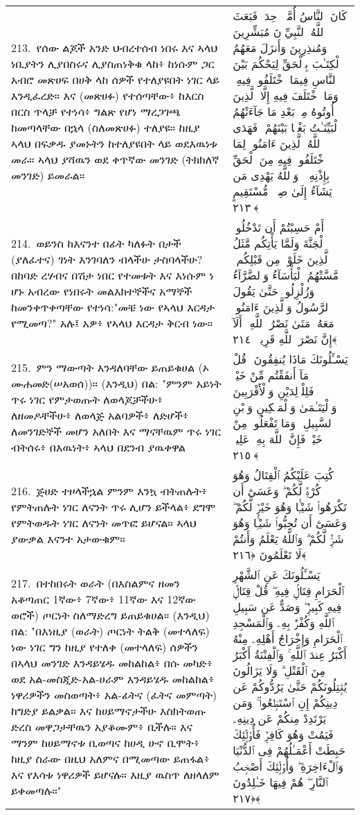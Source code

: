 \documentclass[11pt,a4paper,oneside]{article}%
\newcommand{\mytextarabic}[1]{\textarabic{ #1 \flushright}}
\begin{document}
\begin{longtable}{%
  @{}
    p{}
  @{~~~}
    p{}
    @{}
}
213.\ የሰው ልጆች አንድ ህብረተሰብ ነበሩ እና ኣላህ ነቢያትን ሊያበስሩና ሊያስጠነቅቁ ላከ፥ ከነሱም ጋር አብሮ መጽሀፍ በሀቅ ላከ ሰዎች የተለያዩበት ነገር ላይ እንዲፈረድ። እና (መጽሀፉ) የተሰጣቸው፥ ከእርስ በርስ ጥላቻ የተነሳ፥ ግልጽ የሆነ ማረጋገጫ ከመጣላቸው በኋላ (ስለመጽሀፉ) ተለያዩ። ከዚያ ኣላህ በፍቃዱ ያመኑትን ከተለያዩበት ላይ ወደእዉነቱ መራ። ኣላህ ያሻዉን ወደ ቀጥኛው መንገድ (ትክክለኛ መንገድ) ይመራል። &  \mytextarabic{ كَانَ ٱلنَّاسُ أُمَّةًۭ وَٟحِدَةًۭ فَبَعَثَ ٱللَّهُ ٱلنَّبِيِّۦنَ مُبَشِّرِينَ وَمُنذِرِينَ وَأَنزَلَ مَعَهُمُ ٱلْكِتَـٰبَ بِٱلْحَقِّ لِيَحْكُمَ بَيْنَ ٱلنَّاسِ فِيمَا ٱخْتَلَفُوا۟ فِيهِ ۚ وَمَا ٱخْتَلَفَ فِيهِ إِلَّا ٱلَّذِينَ أُوتُوهُ مِنۢ بَعْدِ مَا جَآءَتْهُمُ ٱلْبَيِّنَـٰتُ بَغْيًۢا بَيْنَهُمْ ۖ فَهَدَى ٱللَّهُ ٱلَّذِينَ ءَامَنُوا۟ لِمَا ٱخْتَلَفُوا۟ فِيهِ مِنَ ٱلْحَقِّ بِإِذْنِهِۦ ۗ وَٱللَّهُ يَهْدِى مَن يَشَآءُ إِلَىٰ صِرَٟطٍۢ مُّسْتَقِيمٍ ﴿٢١٣﴾}\\
214.\ ወይንስ ከእናንተ በፊት ካለፉት በታች (ያለፈተና) ገነት እንገባለን ብላችሁ ታስባላችሁ? በከባድ ረሃብና በሽታ ነበር የተመቱት እና እነሱም ነ ሆኑ አብረው የነበሩት መልእክተኞችና አማኞች ከመንቀጥቀጣቸው የተነሳ:"መቼ ነው የኣላህ እርዳታ የሚመጣ?" አሉ፤ አዎ፥ የኣላህ እርዳታ ቅርብ ነው። &  \mytextarabic{أَمْ حَسِبْتُمْ أَن تَدْخُلُوا۟ ٱلْجَنَّةَ وَلَمَّا يَأْتِكُم مَّثَلُ ٱلَّذِينَ خَلَوْا۟ مِن قَبْلِكُم ۖ مَّسَّتْهُمُ ٱلْبَأْسَآءُ وَٱلضَّرَّآءُ وَزُلْزِلُوا۟ حَتَّىٰ يَقُولَ ٱلرَّسُولُ وَٱلَّذِينَ ءَامَنُوا۟ مَعَهُۥ مَتَىٰ نَصْرُ ٱللَّهِ ۗ أَلَآ إِنَّ نَصْرَ ٱللَّهِ قَرِيبٌۭ ﴿٢١٤﴾}\\
215.\ ምን ማውጣት እንዳለባቸው ይጠይቁሀል (ኦ ሙሐመድ(ሠአወሰ))። (እንዲህ) በል: "ምንም አይነት ጥሩ ነገር የምታወጡት ለወላጆቻችሁ፥ ለዘመዶቸችሁ፥ ለወላጅ አልባዎች፥ ለድሆች፥ ለመንገድኞች መሆን አለበት እና ማናቸዉም ጥሩ ነገር ብትሰሩ፥ በእዉነት፥ ኣላህ በደንብ ያዉቀዋል &  \mytextarabic{ يَسْـَٔلُونَكَ مَاذَا يُنفِقُونَ ۖ قُلْ مَآ أَنفَقْتُم مِّنْ خَيْرٍۢ فَلِلْوَٟلِدَيْنِ وَٱلْأَقْرَبِينَ وَٱلْيَتَـٰمَىٰ وَٱلْمَسَٟكِينِ وَٱبْنِ ٱلسَّبِيلِ ۗ وَمَا تَفْعَلُوا۟ مِنْ خَيْرٍۢ فَإِنَّ ٱللَّهَ بِهِۦ عَلِيمٌۭ ﴿٢١٥﴾}\\
216.\ ጅሀድ ተዞላችኋል ምንም እንኳ ብትጠሉት፥ የምትጠሉት ነገር ለናንት ጥሩ ሊሆን ይችላል፥ ደግሞ የምትወዱት ነገር ለናንት መጥፎ ይሆናል። ኣላህ ያውቃል እናንተ አታውቁም። &  \mytextarabic{كُتِبَ عَلَيْكُمُ ٱلْقِتَالُ وَهُوَ كُرْهٌۭ لَّكُمْ ۖ وَعَسَىٰٓ أَن تَكْرَهُوا۟ شَيْـًۭٔا وَهُوَ خَيْرٌۭ لَّكُمْ ۖ وَعَسَىٰٓ أَن تُحِبُّوا۟ شَيْـًۭٔا وَهُوَ شَرٌّۭ لَّكُمْ ۗ وَٱللَّهُ يَعْلَمُ وَأَنتُمْ لَا تَعْلَمُونَ ﴿٢١٦﴾}\\
217.\ በተከበሩት ወራት (በእስልምና ዘመን አቆጣጠር 1ኛው፥ 7ኛው፥ 11ኛው እና 12ኛው ወሮች) ጦርነት ስለማድረግ ይጠይቁሀል። (እንዲህ) በል: "በእነዚያ (ወራት) ጦርነት ትልቅ (መተላለፍ) ነው ነገር ግን ከዚያ የተለቀ (መተላለፍ) ሰዎችን በኣላህ መንገድ እንዳይሄዱ መከልከል፥ በሱ መካድ፥ ወደ አል-መስጂድ-አል-ሀራም እንዳይሄዱ መከልከል፥ ነዋሪዎችን መስወጣት፥ አል-ፊትና (ፈትና መምጣት) ከግድያ ይልቃል። እና ከሀይማኖታችሁ እስክትወጡ ድረስ መዋጋታቸዉን አያቆሙም፥ ቢችሉ። እና ማንም ከሀይማኖቱ ቢወጣና ከሀዲ ሁኖ ቢሞት፥ ከዚያ ስራው በዚህ አለምና በሚመጣው ይጠፋል፥ እና የእሳቱ ነዋሪዎች ይሆናሉ። እዚያ ዉስጥ ለዘላለም ይቀመጣሉ።" &  \mytextarabic{يَسْـَٔلُونَكَ عَنِ ٱلشَّهْرِ ٱلْحَرَامِ قِتَالٍۢ فِيهِ ۖ قُلْ قِتَالٌۭ فِيهِ كَبِيرٌۭ ۖ وَصَدٌّ عَن سَبِيلِ ٱللَّهِ وَكُفْرٌۢ بِهِۦ وَٱلْمَسْجِدِ ٱلْحَرَامِ وَإِخْرَاجُ أَهْلِهِۦ مِنْهُ أَكْبَرُ عِندَ ٱللَّهِ ۚ وَٱلْفِتْنَةُ أَكْبَرُ مِنَ ٱلْقَتْلِ ۗ وَلَا يَزَالُونَ يُقَٟتِلُونَكُمْ حَتَّىٰ يَرُدُّوكُمْ عَن دِينِكُمْ إِنِ ٱسْتَطَٟعُوا۟ ۚ وَمَن يَرْتَدِدْ مِنكُمْ عَن دِينِهِۦ فَيَمُتْ وَهُوَ كَافِرٌۭ فَأُو۟لَٟٓئِكَ حَبِطَتْ أَعْمَـٰلُهُمْ فِى ٱلدُّنْيَا وَٱلْءَاخِرَةِ ۖ وَأُو۟لَٟٓئِكَ أَصْحَٟبُ ٱلنَّارِ ۖ هُمْ فِيهَا خَـٰلِدُونَ ﴿٢١٧﴾}\\

\end{longtable}
\end{document}
